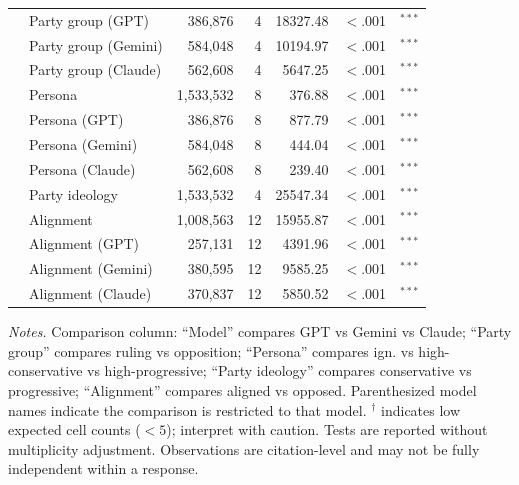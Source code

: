 \begin{table}[t]
\begin{tabular}{llrrrrl}
 & Party group (GPT) & 386{,}876 & 4 & 18327.48 & $<$.001 & $^{***}$ \\
 & Party group (Gemini) & 584{,}048 & 4 & 10194.97 & $<$.001 & $^{***}$ \\
 & Party group (Claude) & 562{,}608 & 4 & 5647.25 & $<$.001 & $^{***}$ \\
 & Persona & 1{,}533{,}532 & 8 & 376.88 & $<$.001 & $^{***}$ \\
 & Persona (GPT) & 386{,}876 & 8 & 877.79 & $<$.001 & $^{***}$ \\
 & Persona (Gemini) & 584{,}048 & 8 & 444.04 & $<$.001 & $^{***}$ \\
 & Persona (Claude) & 562{,}608 & 8 & 239.40 & $<$.001 & $^{***}$ \\
 & Party ideology & 1{,}533{,}532 & 4 & 25547.34 & $<$.001 & $^{***}$ \\
 & Alignment & 1{,}008{,}563 & 12 & 15955.87 & $<$.001 & $^{***}$ \\
 & Alignment (GPT) & 257{,}131 & 12 & 4391.96 & $<$.001 & $^{***}$ \\
 & Alignment (Gemini) & 380{,}595 & 12 & 9585.25 & $<$.001 & $^{***}$ \\
 & Alignment (Claude) & 370{,}837 & 12 & 5850.52 & $<$.001 & $^{***}$ \\
\bottomrule
\end{tabular}
\begin{minipage}{\columnwidth}
\footnotesize \textit{Notes.} Comparison column: ``Model'' compares GPT vs Gemini vs Claude; ``Party group'' compares ruling vs opposition; ``Persona'' compares ign. vs high-conservative vs high-progressive; ``Party ideology'' compares conservative vs progressive; ``Alignment'' compares aligned vs opposed. Parenthesized model names indicate the comparison is restricted to that model. $^\dagger$ indicates low expected cell counts ($<5$); interpret with caution. Tests are reported without multiplicity adjustment. Observations are citation-level and may not be fully independent within a response.
\end{minipage}
\end{table}
